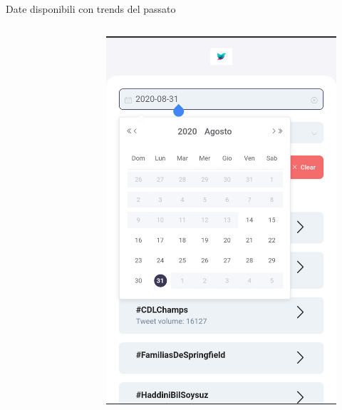 \documentclass[xcolor=svgnames, aspectratio=169]{beamer}
\begin{document}
\begin{frame}{Date disponibili con trends del passato}
\begin{columns}[t]
\begin{figure}[H]
        \end{figure}
        \vspace*{-12pt}
        \begin{figure}[H]
            \centering\includegraphics[width=0.32\paperwidth,height=0.65\paperheight,keepaspectratio]{Mobile_Chrome_Ricerca_Scelta_data.jpg}
        \end{figure}
    \end{columns}
\end{frame}

\end{document}
